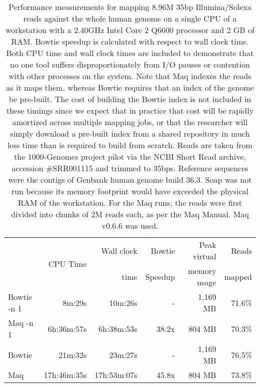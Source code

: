 \documentclass[letterpaper]{article}
\begin{document}
\begin{table}[tp]
\scriptsize
\begin{tabular}{lrrrrr}
\toprule
 & \multirow{2}{*}{CPU Time} & Wall clock & Bowtie  & Peak virtual & Reads  \\
 &                            & time       & Speedup & memory usage & mapped \\[3pt]
\toprule
Bowtie -n 1 & 8m:29s & 10m:26s & - & 1,169 MB & 71.6\%\\\midrule
Maq -n 1 & 6h:36m:57s & 6h:38m:53s & 38.2x & 804 MB & 70.3\%\\\midrule
\midrule
Bowtie & 21m:32s & 23m:27s & - & 1,169 MB & 76.5\%\\\midrule
Maq & 17h:46m:35s & 17h:53m:07s & 45.8x & 804 MB & 73.8\%\\
\bottomrule
\end{tabular}
\caption{Performance measurements for mapping 8.96M 35bp Illumina/Solexa reads against the whole human genome on a single CPU of a workstation with a 2.40GHz Intel Core 2 Q6600 processor and 2 GB of RAM. Bowtie speedup is calculated with respect to wall clock time. Both CPU time and wall clock times are included to demonstrate that no one tool suffers disproportionately from I/O pauses or contention with other processes on the system. Note that Maq indexes the reads as it maps them, whereas Bowtie requires that an index of the genome be pre-built.  The cost of building the Bowtie index is not included in these timings since we expect that in practice that cost will be rapidly amortized across multiple mapping jobs, or that the researcher will simply download a pre-built index from a shared repository in much less time than is required to build from scratch. Reads are taken from the 1000-Genomes project pilot via the NCBI Short Read archive, accession \#SRR001115 and trimmed to 35bps. Reference sequences were the contigs of Genbank human genome build 36.3. Soap was not run because its memory footprint would have exceeded the physical RAM of the workstation. For the Maq runs, the reads were first divided into chunks of 2M reads each, as per the Maq Manual. Maq v0.6.6 was used. }
\end{table}
\end{document}

